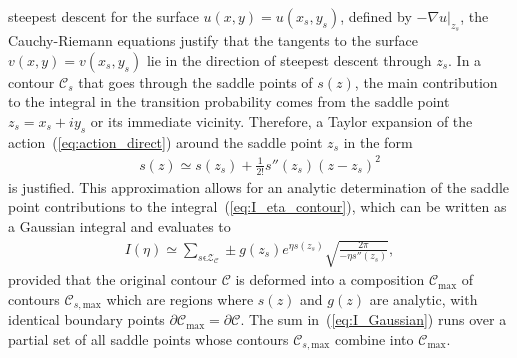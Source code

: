 steepest descent for the surface $u(x,y) = u(x_{s},y_{s})$, defined by
$-\nabla u|_{z_{s}}$, the Cauchy-Riemann equations justify that the
tangents to the surface $v(x,y) = v(x_{s},y_{s})$ lie in the direction
of steepest descent through $z_{s}$. In a contour $\mathcal{C}_{s}$
that goes through the saddle points of $s(z)$, the main contribution
to the integral in the transition probability comes from the saddle
point $z_{s} = x_{s} + iy_{s}$ or its immediate vicinity. Therefore, a
Taylor expansion of the action~(\ref{eq:action_direct}) around the
saddle point $z_{s}$ in the form
%
\begin{eqnarray}
  \label{eq:taylor_exp}
  s(z) \simeq s(z_{s}) + \frac{1}{2!}s''(z_{s})(z - z_{s})^{2} 
\end{eqnarray}
%
is justified. This approximation allows for an analytic determination
of the saddle point contributions to the
integral~(\ref{eq:I_eta_contour}), which can be written as a Gaussian
integral and evaluates to~\cite{phd_Kopold}
%
\begin{eqnarray}
  \label{eq:I_Gaussian}
  I(\eta) \simeq \sum\limits_{s\mathrm{\epsilon} \mathcal{Z}_{\mathcal{C}}}
  \pm g(z_{s}) e^{\eta s(z_{s})} \sqrt{\frac{2\pi}{-\eta s''(z_{s})}},
\end{eqnarray}
%
provided that the original contour $\mathcal{C}$ is deformed into a
composition $\mathcal{C}_{\mathrm{max}}$ of contours
$\mathcal{C}_{s,\mathrm{max}}$ which are regions where $s(z)$ and
$g(z)$ are analytic, with identical boundary points
$\partial\mathcal{C}_{\mathrm{max}} = \partial\mathcal{C}$. The sum
in~(\ref{eq:I_Gaussian}) runs over a partial set of all saddle points
whose contours $\mathcal{C}_{s,\mathrm{max}}$ combine into
$\mathcal{C}_{\mathrm{max}}$.

